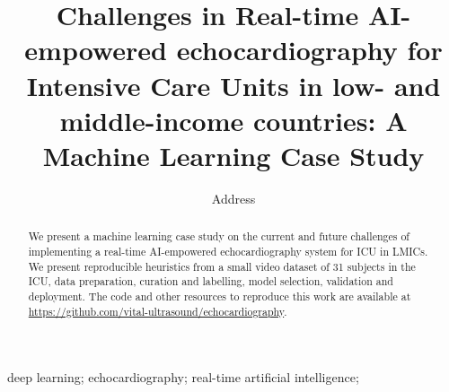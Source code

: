 \documentclass[mlabstract,twocolumn]{jmlr}
\title[Short Title]{
Challenges in Real-time AI-empowered echocardiography for Intensive Care Units in low- and middle-income countries: A Machine Learning Case Study %
}
\author{
     \Name{Anonymous Author(s)} \Email{email@sample.com}
      \addr Address
   }
\begin{document}
\maketitle

\begin{abstract}
We present a machine learning case study on the current and future challenges of implementing a real-time AI-empowered echocardiography system for ICU in LMICs.
We present reproducible heuristics from a small video dataset of 31 subjects in the ICU, data preparation, curation and labelling, model selection, validation and deployment.
The code and other resources to reproduce this work are available at \url{https://github.com/vital-ultrasound/echocardiography}.
\end{abstract}
\begin{keywords}
deep learning; echocardiography; real-time artificial intelligence;
\end{keywords}
\end{document}
